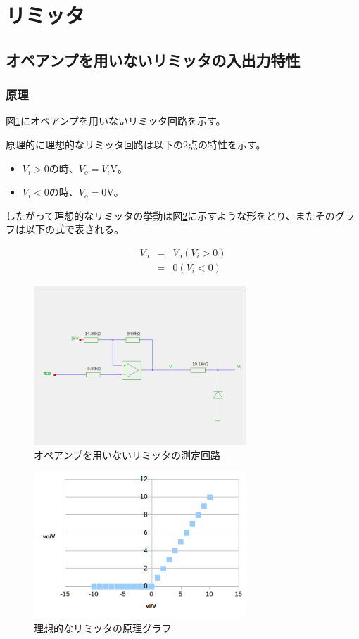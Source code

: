 \documentclass[11pt,a4j]{jsarticle}
\begin{document}
   \clearpage
   
 \section{リミッタ}
  \subsection{オペアンプを用いないリミッタの入出力特性}
   \subsubsection{原理}
    
    図\ref{fig:noamp_tokusei}にオペアンプを用いないリミッタ回路を示す。
    
    原理的に理想的なリミッタ回路は以下の2点の特性を示す。
    \begin{itemize}
    \item $V_i > 0$の時、$V_o = V_i$V。
    \item $V_i < 0$の時、$V_o = 0$V。
    \end{itemize}
    したがって理想的なリミッタの挙動は図\ref{fig:risou_limitter}に示すような形をとり、またそのグラフは以下の式で表される。
    
    \begin{eqnarray}
    V_o &=& V_o (V_i >0) \\
            &=& 0 (V_i < 0)
    \end{eqnarray}
    
    
    
    \begin{figure}[htbp]
  \centering
  \includegraphics[width=8cm,clip]{noamp_tokusei.png}
  \caption{オペアンプを用いないリミッタの測定回路}
  \label{fig:noamp_tokusei}
 \end{figure}%
    
    \begin{figure}[htbp]
  \centering
  \includegraphics[width=8cm,clip]{risou_limitter.png}
  \caption{理想的なリミッタの原理グラフ}
  \label{fig:risou_limitter}
 \end{figure}
    
\end{document}
